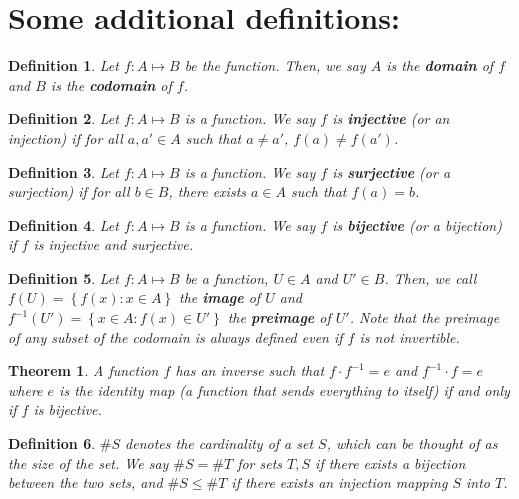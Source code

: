 \documentclass[letterpaper,12pt]{article}
\newcommand{\set}[1]{\left\{ #1 \right\}}
\newtheorem{theorem}{Theorem}[section]
\newtheorem{definition}{Definition}[section]
\begin{document}
\section*{Some additional definitions:}
\begin{definition}
    Let $f:A \mapsto B$ be the function. Then, we say $A$ is the \textbf{domain} of $f$ and $B$ is the \textbf{codomain} of $f$.
\end{definition}
\begin{definition}
    Let $f:A \mapsto B$ is a function. We say $f$ is \textbf{injective} (or an injection) if for all $a,a' \in A$ such that $a \neq a'$, $f(a) \neq f(a')$.
\end{definition}
\begin{definition}
      Let $f:A \mapsto B$ is a function. We say $f$ is \textbf{surjective} (or a surjection) if for all $b \in B$, there exists $a \in A$ such that $f(a) = b$.
\end{definition}
\begin{definition}
     Let $f:A \mapsto B$ is a function. We say $f$ is \textbf{bijective} (or a bijection) if $f$ is injective and surjective.
\end{definition}
\begin{definition}
    Let $f:A \mapsto B$ be a function, $U \in A$ and $U' \in B$. Then, we call $f(U) = \set{f(x):x \in A}$ the \textbf{image} of $U$ and $f^{-1}(U') = \set{x \in A : f(x) \in U'}$ the \textbf{preimage} of $U'$. Note that the preimage of any subset of the codomain is always defined even if $f$ is not invertible.
\end{definition}
\begin{theorem}
    A function $f$ has an inverse such that $f\cdot f^{-1} = e$ and $f^{-1} \cdot f = e$ where $e$ is the identity map (a function that sends everything to itself) if and only if $f$ is bijective.
\end{theorem}
\begin{definition}
    $\# S$ denotes the cardinality of a set $S$, which can be thought of as the size of the set. We say $\# S = \# T$ for sets $T,S$ if there exists a bijection between the two sets, and $\#S \leq \#T$ if there exists an injection mapping $S$ into $T$.
\end{definition}
\end{document}
